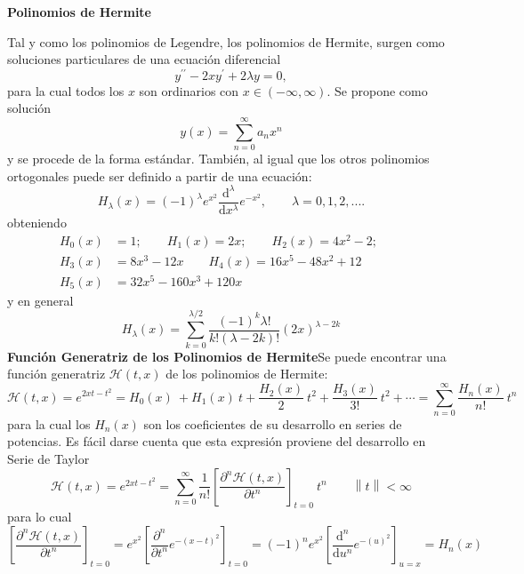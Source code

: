 \documentclass[spanish,notitlepage,letterpaper,12pt]{article}
\begin{document}
\begin{center}
\textbf{Polinomios de Hermite}
\end{center}

Tal y como los polinomios de Legendre, los polinomios de Hermite, surgen como
soluciones particulares de una ecuaci\'{o}n diferencial
\[
y^{\prime\prime}-2xy^{\prime}+2\lambda y=0,
\]
para la cual todos los $x$ son ordinarios con $x\in(-\infty,\infty).$ Se
propone como soluci\'{o}n
\[
y(x)=\sum_{n=0}^{\infty}a_{n}x^{n}
\]
y se procede de la forma est\'{a}ndar. Tambi\'{e}n, al igual que los otros
polinomios ortogonales puede ser definido a partir de una ecuaci\'{o}n:
\begin{equation}
H_{\lambda}(x)=(-1)^{\lambda}e^{x^{2}}\frac{\mathrm{d}^{\lambda}}%
{\mathrm{d}x^{\lambda}}e^{-x^{2}},\qquad\lambda=0,1,2,....\label{HermiteDef}%
\end{equation}
obteniendo
\begin{align*}
H_{0}(x)  & =1;\qquad H_{1}(x)=2x;\qquad H_{2}(x)=4x^{2}-2;\qquad\\
H_{3}(x)  & =8x^{3}-12x\qquad H_{4}(x)=16x^{5}-48x^{2}+12\\
H_{5}(x)  & =32x^{5}-160x^{3}+120x\qquad
\end{align*}
y en general
\[
H_{\lambda}(x)=\sum_{k=0}^{\lambda/2}\frac{(-1)^{k}\lambda!}{k!\left(
\lambda-2k\right)  !}\left(  2x\right)  ^{\lambda-2k}
\]
\textbf{Funci\'{o}n Generatriz de los Polinomios de Hermite}\newline Se puede
encontrar una funci\'{o}n generatriz $\mathcal{H}(t,x)$ de los polinomios de
Hermite:
\[
\mathcal{H}(t,x)=e^{2xt-t^{2}}=H_{0}(x)\ +H_{1}(x)\ t+\frac{H_{2}(x)}%
2\ t^{2}+\frac{H_{3}(x)}{3!}\ t^{2}+\cdots=\sum_{n=0}^{\infty}\frac{H_{n}%
(x)}{n!}\ t^{n}
\]
para la cual los $H_{n}(x)$ son los coeficientes de su desarrollo en series de
potencias. Es f\'{a}cil darse cuenta que esta expresi\'{o}n proviene del
desarrollo en Serie de Taylor
\[
\mathcal{H}(t,x)=e^{2xt-t^{2}}=\sum_{n=0}^{\infty}\frac1{n!}\left[
\frac{\partial^{n}\mathcal{H}(t,x)}{\partial t^{n}}\right]  _{t=0}%
\ t^{n}\qquad\left\|  t\right\|  <\infty
\]
para lo cual
\[
\left[  \frac{\partial^{n}\mathcal{H}(t,x)}{\partial t^{n}}\right]
_{t=0}=e^{x^{2}}\left[  \frac{\partial^{n}}{\partial t^{n}}e^{-\left(
x-t\right)  ^{2}}\right]  _{t=0}=\left(  -1\right)  ^{n}e^{x^{2}}\left[
\frac{\mathrm{d}^{n}}{\mathrm{d}u^{n}}e^{-\left(  u\right)  ^{2}}\right]
_{u=x}=H_{n}(x)
\]
\end{document}
